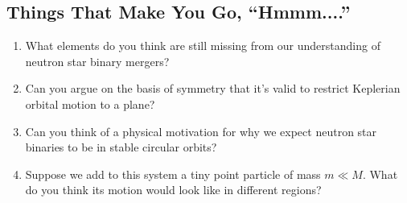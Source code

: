 \documentclass[11pt]{article}
\begin{document}

\begin{mdframed}
\vspace{-15pt}

\section*{Things That Make You Go, ``Hmmm....''}

\begin{enumerate}

\item What elements do you think are still missing from our understanding of neutron star binary mergers?

\item Can you argue on the basis of symmetry that it's valid to restrict Keplerian orbital motion to a plane?

\item Can you think of a physical motivation for why we expect neutron star binaries to be in stable circular orbits?

\item Suppose we add to this system a tiny point particle of mass $m \ll M$. What do you think its motion would look like in different regions?

\end{enumerate}

\end{mdframed}


\vspace{1000pt}
\end{document}
